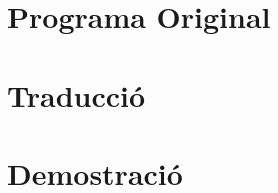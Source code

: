 \documentclass[a4paper,12pt]{article}
\newcommand{\mygraphic}[2][width=\textwidth]{\begin{center}
		\centering\texttt{[image: \#2]}\par
\end{center}}
\begin{document}


\newpage
\section{Programa Original}


\newpage
\section{Traducció}


\newpage
\section{Demostració}
\end{document}
